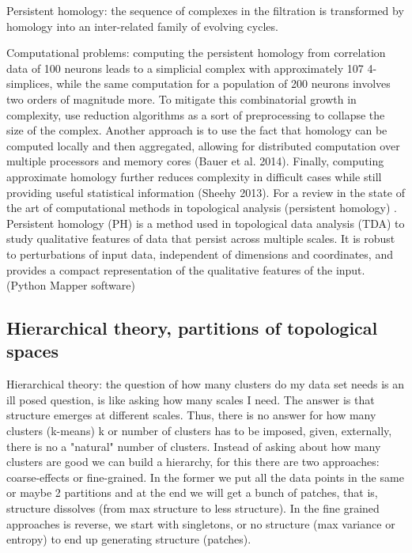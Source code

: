 \documentclass[onecollarge,runningheads]{svjour2}
\begin{document}
Persistent homology:  the sequence of complexes in the filtration is transformed by homology into an inter-related family of evolving cycles.

Computational problems: computing the persistent homology from correlation data of 100 neurons leads to a simplicial complex with approximately 107 4-simplices, while the same computation for a population of 200 neurons involves two orders of magnitude more.
To mitigate this combinatorial growth in complexity, use reduction algorithms as a sort of preprocessing to collapse the size of the complex.
Another approach is to use the fact that homology can be computed locally and then aggregated, allowing for distributed computation over multiple processors and memory cores (Bauer et al. 2014). Finally, computing approximate homology further reduces complexity in difficult cases while still providing useful statistical information (Sheehy 2013). 
For a review in the state of the art of computational methods in topological analysis (persistent homology) \citep{otter2015roadmap}.
Persistent homology (PH) is a method used in topological data analysis (TDA) to study qualitative features of data that persist across multiple scales. It is robust to perturbations of input data, independent of dimensions and coordinates, and provides a compact representation of the qualitative features of the input. (Python Mapper software) 

\subsection{Hierarchical theory, partitions of topological spaces }
\label{sec:2}

Hierarchical theory: the question of how many clusters do my data set needs is an ill posed question, is like asking how many scales I need. The answer is that structure emerges at different scales. Thus, there is no answer for how many clusters (k-means) k or number of clusters has to be imposed, given, externally, there is no a "natural" number of clusters. Instead of asking about how many clusters are good we can build a hierarchy, for this there are two approaches: coarse-effects or fine-grained.
In the former we put all the data points in the same or maybe 2 partitions and at the end we will get a bunch of patches, that is, structure dissolves (from max structure to less structure). In the fine grained approaches is reverse, we start with singletons, or no structure (max variance or entropy) to end up generating structure (patches).
 
\end{document}
